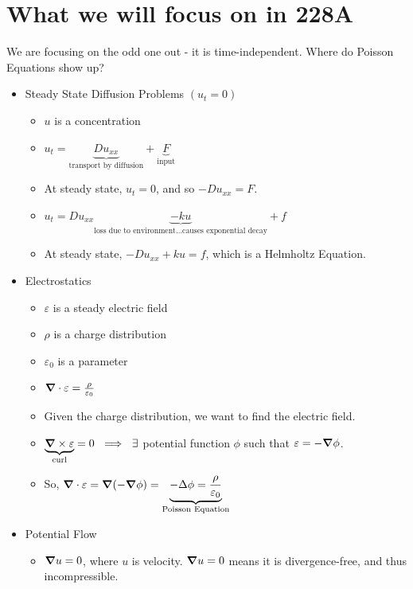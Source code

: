 \documentclass{article}
\newcommand{\E}{\varepsilon}
\begin{document}
    \section{What we will focus on in 228A}

        We are focusing on the odd one out - it is time-independent.  Where do Poisson Equations show up?
        \begin{itemize}
            \item Steady State Diffusion Problems $(u_t = 0)$
            \begin{itemize}
                \item $u$ is a concentration
                \item $u_t = \underbrace{D u_{xx}}_{\text{transport by diffusion}} + \underbrace{F}_{\text{input}}$
                \item At steady state, $u_t = 0$, and so $-Du_{xx} = F$.
                \item $u_t = D u_{xx} \underbrace{- ku}_{\text{loss due to environment$\dots$causes exponential decay}} + f$
                \item At steady state, $-D u_{xx} + ku = f$, which is a Helmholtz Equation.
            \end{itemize}
            \item Electrostatics
            \begin{itemize}
                \item $\E$ is a steady electric field
                \item $\rho$ is a charge distribution
                \item $\E_0$ is a parameter
                \item $\grad\cdot \E = \frac{\rho}{\E_0}$
                \item Given the charge distribution, we want to find the electric field.
                \item $\underbrace{\grad \times \E}_{\text{curl}} = 0\ \implies\ \exists$ potential function $\phi$ such that $\E = -\grad\phi$.
                \item So, $\grad \cdot \E = \grad(-\grad\phi) = \underbrace{-\Delta \phi = \frac{\rho}{\E_0}}_{\text{Poisson Equation}}$
            \end{itemize}
            \item Potential Flow
            \begin{itemize}
                \item $\grad u = 0$, where $u$ is velocity.  $\grad u = 0$ means it is divergence-free, and thus incompressible.

\end{itemize}
\end{itemize}
\end{document}
